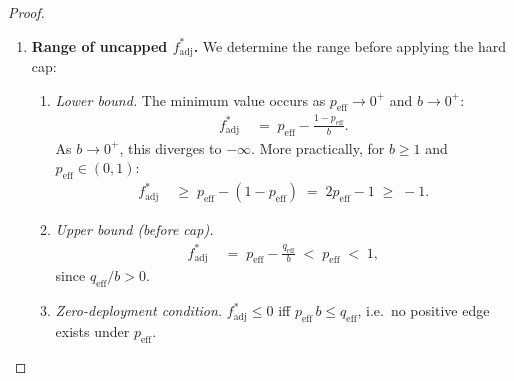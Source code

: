 \documentclass[12pt,openany]{book}
\numberwithin{equation}{chapter}
\theoremstyle{plain}
\theoremstyle{definition}
\theoremstyle{remark}
\numberwithin{equation}{chapter}
\theoremstyle{plain}
\begin{document}
\begin{proof}
\begin{enumerate}
  \item[\textup{(3)}] \textbf{Range of uncapped $f^*_{\mathrm{adj}}$.}
        We determine the range before applying the hard cap:
        \begin{enumerate}
          \item[\textup{(3a)}] \textit{Lower bound.}
                The minimum value occurs as
                $p_{\mathrm{eff}} \to 0^+$ and $b \to 0^+$:
                \begin{align}
                  f^*_{\mathrm{adj}}
                  &\;=\; p_{\mathrm{eff}}
                         - \frac{1 - p_{\mathrm{eff}}}{b}.
                  \label{eq:kadj-lb}
                \end{align}
                As $b \to 0^+$, this diverges to $-\infty$.
                More practically, for $b \geq 1$ and
                $p_{\mathrm{eff}} \in (0,1)$:
                \begin{align}
                  f^*_{\mathrm{adj}}
                  &\;\geq\; p_{\mathrm{eff}} - (1-p_{\mathrm{eff}})
                  \;=\; 2p_{\mathrm{eff}} - 1
                  \;\geq\; -1.
                  \label{eq:kadj-lb-practical}
                \end{align}

          \item[\textup{(3b)}] \textit{Upper bound (before cap).}
                \begin{align}
                  f^*_{\mathrm{adj}}
                  &\;=\; p_{\mathrm{eff}} - \frac{q_{\mathrm{eff}}}{b}
                  \;<\; p_{\mathrm{eff}}
                  \;<\; 1,
                  \label{eq:kadj-ub}
                \end{align}
                since $q_{\mathrm{eff}}/b > 0$.

          \item[\textup{(3c)}] \textit{Zero-deployment condition.}
                $f^*_{\mathrm{adj}} \leq 0$ iff
                $p_{\mathrm{eff}}\,b \leq q_{\mathrm{eff}}$,
                i.e.\ no positive edge exists under
                $p_{\mathrm{eff}}$.
        \end{enumerate}


\end{enumerate}
\end{proof}
\end{document}
